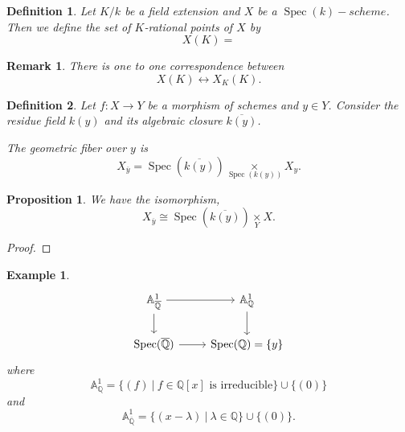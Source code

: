 \documentclass{article}
\newtheorem{proposition}{Proposition}[section]
\newtheorem{definition}{Definition}[section]
\newtheorem{remark}{Remark}[section]
\newtheorem{example}{Example}[section]
\numberwithin{equation}{section}
\DeclareMathOperator{\Spec}{Spec}
\newcommand{\fib}[1]{%
  \mathbin{\mathop{\times}\limits_{#1}}%
}
\begin{document}
\begin{definition}
Let $K/k$ be a field extension and $X$ be a $\Spec(k)-scheme$. Then we define the set of $K$-rational points of $X$ by 
\begin{equation*}
X(K) = %
\end{equation*}
\end{definition}

\begin{remark}
There is one to one correspondence between
\begin{equation*}
X(K)\leftrightarrow X_K(K).
\end{equation*}
\end{remark}

\begin{definition}
Let $f:X\to Y$ be a morphism of schemes and $y\in Y$. Consider the residue field $k(y)$ and its algebraic closure $\overline{k(y)}$. \\
\par The geometric fiber over $y$ is 
\begin{equation*}
X_{\overline{y}} = \Spec(\overline{k(y)})\fib{\Spec(k(y))}X_y.
\end{equation*}
\end{definition}

\begin{proposition}
We have the isomorphism,
\begin{equation*}
X_{\overline{y}} \cong\Spec(\overline{k(y)})\fib{Y}X.
\end{equation*}
\label{isomorphism_geometric_fiber}
\end{proposition}

\begin{proof}
\end{proof}

\begin{example}
\[
\begin{tikzcd}
\mathbb{A}_{\overline{\mathbb{Q}}}^1 \arrow[d] \arrow[r] & \mathbb{A}_{\mathbb{Q}}^1 \arrow[d] \\
\Spec(\overline{\mathbb{Q}}) \arrow[r]                   & \Spec(\mathbb{Q})=\{y\}                  
\end{tikzcd}
\]
where
\begin{equation*}
\mathbb{A}^1_{\mathbb{Q}} = \{(f)\:|\: f \in \mathbb{Q}[x]\text{ is irreducible}\}\cup\{(0)\}
\end{equation*}
and
\begin{equation*}
\mathbb{A}^1_{\overline{\mathbb{Q}}} = \{(x-\lambda)\:|\: \lambda \in \mathbb{Q}\}\cup\{(0)\}.
\end{equation*}
\end{example}
\end{document}
